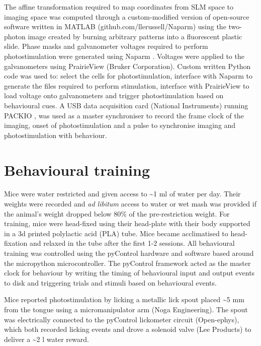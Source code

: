The affine transformation required to map coordinates from SLM space to imaging space was computed through a custom-modified version of open-source software written in MATLAB (github.com/llerussell/Naparm) using the two-photon image created by burning arbitrary patterns into a fluorescent plastic slide. Phase masks and galvanometer voltages required to perform photostimulation were generated using Naparm \cite{russell_influence_2019}. Voltages were applied to the galvanometers using PrairieView (Bruker Corporation). Custom written Python code was used to: select the cells for photostimulation, interface with Naparm to generate the files required to perform stimulation, interface with PrairieView to load voltage onto galvanometers and trigger photostimulation based on behavioural cues. A USB data acquisition card (National Instruments) running PACKIO \cite{watson_packio_2016}, was used as a master synchroniser to record the frame clock of the imaging, onset of photostimulation and a pulse to synchronise imaging and photostimulation with behaviour.

\section{Behavioural training}

Mice were water restricted and given access to \textasciitilde1 ml of water per day. Their weights were recorded and \textit{ad libitum} access to water or wet mash was provided if the animal's weight dropped below 80\% of the pre-restriction weight. For training, mice were head-fixed using their head-plate with their body supported in a 3d printed polylactic acid (PLA) tube. Mice became acclimatised to head-fixation and relaxed in the tube after the first 1-2 sessions. All behavioural training was controlled using the pyControl hardware and software \cite{akam_pycontrol_2021} based around the micropython microcontroller. The pyControl framework acted as the master clock for behaviour by writing the timing of behavioural input and output events to disk and triggering trials and stimuli based on behavioural events.

Mice reported photostimulation by licking a metallic lick spout placed \textasciitilde5 mm from the tongue using a micromanipulator arm (Noga Engineering). The spout was electrically connected to the pyControl lickometer circuit (Open-ephys), which both recorded licking events and drove a solenoid valve (Lee Products) to deliver a \textasciitilde2 \textmu l water reward.

